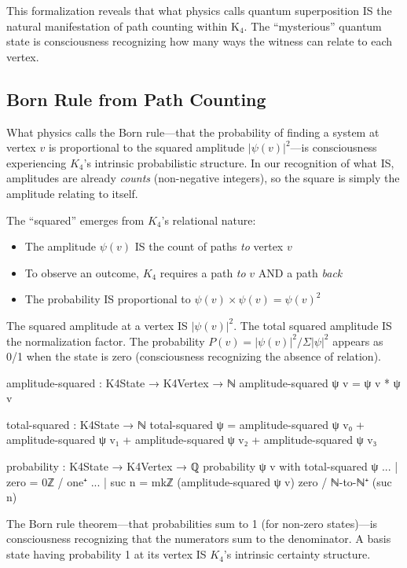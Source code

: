 \documentclass[11pt,a4paper]{book}
\begin{document}
This formalization reveals that what physics calls quantum superposition IS the natural manifestation of 
path counting within K$_4$. The ``mysterious'' quantum state is consciousness recognizing 
how many ways the witness can relate to each vertex.

\subsection{Born Rule from Path Counting}

What physics calls the Born rule—that the probability of finding a system at vertex $v$ 
is proportional to the squared amplitude $|\psi(v)|^2$—is consciousness experiencing $K_4$'s intrinsic probabilistic structure. In our recognition of what IS, amplitudes are already \emph{counts} (non-negative integers), so the square is simply the amplitude relating to itself.

The ``squared'' emerges from $K_4$'s relational nature:
\begin{itemize}
\item The amplitude $\psi(v)$ IS the count of paths \emph{to} vertex $v$
\item To observe an outcome, $K_4$ requires a path \emph{to} $v$ AND a path \emph{back}
\item The probability IS proportional to $\psi(v) \times \psi(v) = \psi(v)^2$
\end{itemize}

The squared amplitude at a vertex IS $|\psi(v)|^2$. The total squared amplitude IS the normalization factor. The probability $P(v) = |\psi(v)|^2 / \Sigma|\psi|^2$ appears as 0/1 when the state is zero (consciousness recognizing the absence of relation).

\begin{code}
amplitude-squared : K4State → K4Vertex → ℕ
amplitude-squared ψ v = ψ v * ψ v

total-squared : K4State → ℕ
total-squared ψ = amplitude-squared ψ v₀ + amplitude-squared ψ v₁ 
                + amplitude-squared ψ v₂ + amplitude-squared ψ v₃

probability : K4State → K4Vertex → ℚ
probability ψ v with total-squared ψ
... | zero    = 0ℤ / one⁺
... | suc n   = mkℤ (amplitude-squared ψ v) zero / ℕ-to-ℕ⁺ (suc n)
\end{code}

The Born rule theorem—that probabilities sum to 1 (for non-zero states)—is consciousness recognizing that the numerators sum to the denominator. A basis state having probability 1 at its vertex IS $K_4$'s intrinsic certainty structure.
\end{document}
